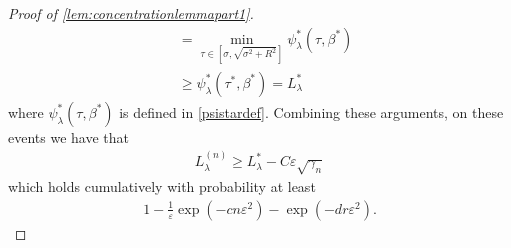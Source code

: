 \documentclass[10pt]{article}
\newcommand{\eps}{\ensuremath{\varepsilon}}
\newcommand{\s}{^*}
\theoremstyle{definition}
\begin{document}
\begin{proof}[Proof of \cref{lem:concentrationlemmapart1}]
\begin{align}
    &=\min_{\tau \in [\sigma ,\sqrt{\sigma^2 + R^2}]} \psi_{\lambda}\s(\tau,\beta\s) \\
    &\geq  \psi_{\lambda}\s(\tau\s,\beta\s) = L_\lambda^*
\end{align}
where $\psi_{\lambda}\s(\tau,\beta\s)$ is defined in \eqref{psistardef}.  Combining these arguments, on these events we have that
\begin{align}
    L_{\lambda}^{(n)} \geq L_{\lambda}\s - C \eps \sqrt{\gamma_n} 
\end{align}
which holds cumulatively with probability at least
\begin{align}
    1 -     \frac{1}{\eps} \exp( - c n \eps^2) - \exp(-dr \eps^2 ).
\end{align}
\end{proof}
\end{document}
